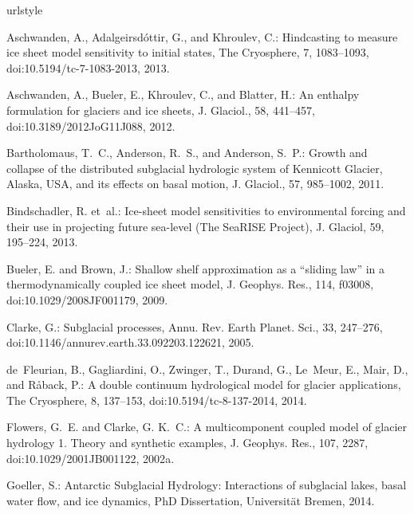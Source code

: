 \documentclass[11pt,reqno]{amsart}
\begin{document}
\begin{thebibliography}{}
\providecommand{\natexlab}[1]{#1}
\providecommand{\url}[1]{{\tt #1}}
\providecommand{\urlprefix}{URL }
\expandafter\ifx\csname urlstyle\endcsname\relax
  \providecommand{\doi}[1]{doi:\discretionary{}{}{}#1}\else
  \providecommand{\doi}{doi:\discretionary{}{}{}\begingroup
  \urlstyle{rm}\Url}\fi

Aschwanden, A., Adalgeirsd{\'o}ttir, G., and Khroulev, C.: Hindcasting to
  measure ice sheet model sensitivity to initial states, The Cryosphere, 7,
  1083--1093, \doi{10.5194/tc-7-1083-2013}, 2013.

Aschwanden, A., Bueler, E., Khroulev, C., and Blatter, H.: An enthalpy
  formulation for glaciers and ice sheets, J. Glaciol., 58, 441--457,
  \doi{10.3189/2012JoG11J088}, 2012.

Bartholomaus, T.~C., Anderson, R.~S., and Anderson, S.~P.: Growth and collapse
  of the distributed subglacial hydrologic system of {K}ennicott {G}lacier,
  {A}laska, {USA}, and its effects on basal motion, J. Glaciol., 57, 985--1002,
  2011.

Bindschadler, R. et~al.: Ice-sheet model sensitivities to environmental forcing
  and their use in projecting future sea-level ({T}he {S}ea{RISE} {P}roject),
  J. Glaciol, 59, 195--224, 2013.

Bueler, E. and Brown, J.: Shallow shelf approximation as a ``sliding law'' in a
  thermodynamically coupled ice sheet model, J. Geophys. Res., 114, f03008,
  doi:10.1029/2008JF001179, 2009.

Clarke, G.: Subglacial processes, Annu. Rev. Earth Planet. Sci., 33,
  247--276, \doi{10.1146/annurev.earth.33.092203.122621}, 2005.

de~Fleurian, B., Gagliardini, O., Zwinger, T., Durand, G., Le~Meur, E., Mair,
  D., and R{\aa}back, P.: A double continuum hydrological model for glacier
  applications, The Cryosphere, 8, 137--153, \doi{10.5194/tc-8-137-2014}, 2014.

Flowers, G.~E. and Clarke, G. K.~C.: A multicomponent coupled model of glacier
  hydrology 1. {T}heory and synthetic examples, J. Geophys. Res., 107, 2287,
  \doi{10.1029/2001JB001122}, 2002{\natexlab{a}}.

Goeller, S.: Antarctic {S}ubglacial {H}ydrology: {I}nteractions of subglacial lakes, basal water flow, and ice dynamics, PhD Dissertation, Universit\"at Bremen, 2014.


\end{thebibliography}
\end{document}

